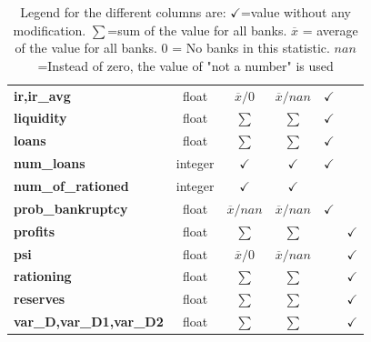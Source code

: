 \documentclass{article}
\begin{document}
\begin{table}[h]
\begin{tabular}{|l|c|c|c|c|c|}
\textbf{ir,ir\_avg}                &  float &  $\overline{x}/0$ & $\overline{x} / nan $  & $\checkmark$ &  \\
\textbf{liquidity}         &  float &  $\sum$ &  $\sum$ &  $\checkmark$ &    \\
\textbf{loans}        & float &  $ \sum$ &  $ \sum$ & $\checkmark$ &  \\
\textbf{num\_loans}        &  integer &  $ \checkmark$ &  $\checkmark$ & $\checkmark$ &  \\
\textbf{num\_of\_rationed} & integer &  $\checkmark$ & $\checkmark$ &  & \\
\textbf{prob\_bankruptcy}  &  float &  $\overline{x}/nan$ & $\overline{x}/nan$  &  $\checkmark$  & \\
\textbf{profits}           & float &  $ \sum$ &  $ \sum$ &  & $\checkmark$ \\
\textbf{psi} &  float &  $\overline{x}/0 $ & $\overline{x}/nan $ &  & $\checkmark$ \\
\textbf{rationing}         &  float &  $\sum$ &  $\sum$ &  & $\checkmark$  \\
\textbf{reserves}          & float & $ \sum$ &  $ \sum$ &  & $\checkmark$ \\
\textbf{var\_D,var\_D1,var\_D2} &  float &   $\sum$  &  $\sum$  &  &  $\checkmark$  \\
\hline
\end{tabular}
\caption{ Legend for the different columns are: $\checkmark$=value without any modification. $\sum$=sum of the value for all banks. $ \overline{x}$ = average of the value for all banks. $0$ = No banks in this statistic. $nan$=Instead of zero, the value of "not a number" is used}
\label{table1}
\end{table}
\end{document}
